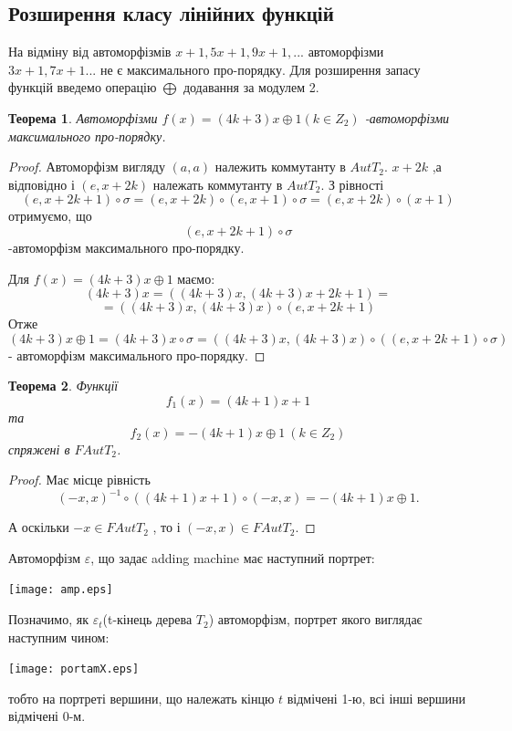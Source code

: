 \documentclass[a4paper,12pt]{article} \usepackage{a4wide}
\numberwithin{equation}{subsection}
\newtheorem{theorem}{Теорема}[subsection]
\begin{document}
  \subsection{Розширення класу лінійних функцій}
  На відміну від автоморфізмів $x+1, 5x+1, 9x+1,...$ автоморфізми $3x+1,7x+1...$ не є максимального про-порядку.
Для розширення запасу функцій введемо операцію $\bigoplus$ додавання за модулем 2.
\begin{theorem}
Автоморфізми $ f(x)=(4k+3)  x\oplus 1 (k\in Z_2)$ -автоморфізми максимального про-порядку.
\end{theorem}
\begin{proof}

 Автоморфізм вигляду $(a,a)$ належить коммутанту в $AutT_2$. ${x+2k}$ ,а відповідно
 і $(e,{x+2k})$
 належать коммутанту в $AutT_2$. З рівності$$(e,x+2k+1)\circ \sigma=(e,x+2k)\circ (e,x+1)\circ \sigma =(e,x+2k)\circ (x+1)$$
отримуємо, що $$(e,x+2k+1)\circ \sigma$$
-автоморфізм максимального про-порядку.

 Для $f(x)=(4k+3)  x\oplus 1$ маємо:
 $${(4k+3)x}=({(4k+3)x},{(4k+3)x+2k+1})=$$
$$=({(4k+3)x},{(4k+3)x})\circ  (e,{x+2k+1})$$
  Отже $${(4k+3)x\oplus 1}={(4k+3)x}\circ  \sigma=({(4k+3)x},{(4k+3)x})\circ  ((e,{x+2k+1})\circ  \sigma)$$- автоморфізм максимального
 про-порядку.
\end{proof}
\begin{theorem}\label{sp1}
Функції $$f_1(x)=(4k+1)x+1$$ та $$f_2(x)=-(4k+1)x\oplus 1 \ (k\in Z_2)$$ спряжені в $FAutT_2$.

\end{theorem}
\begin{proof} Має місце рівність
$${(-x,x)}^{-1}\circ  {((4k+1)x+1)}\circ  {(-x,x)}={-(4k+1)x}\oplus
1.$$

 А оскільки ${-x}\in FAutT_2$ , то і ${(-x,x)}\in FAutT_2$.

\end{proof}

Автоморфізм $\varepsilon$, що задає adding machine має наступний портрет:
 \begin{center}
\texttt{[image: amp.eps]}
\end{center}
Позначимо, як $\varepsilon_t$(t-кінець дерева $T_2$) автоморфізм, портрет якого виглядає наступним чином:
\begin{center}
\texttt{[image: portamX.eps]}
\end{center}
тобто на портреті вершини, що належать кінцю $t$ відмічені 1-ю, всі інші вершини відмічені 0-м.
\end{document}
